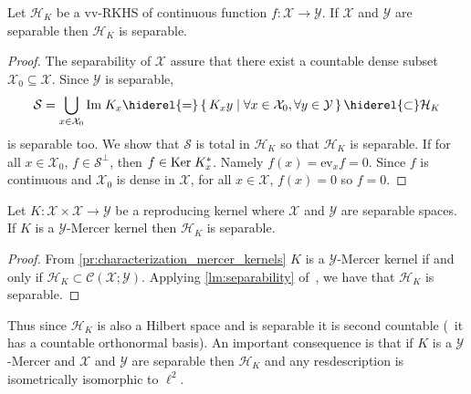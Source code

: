 \begin{lemma}
\label{lm:separability}
Let $\mathcal{H}_K$ be a \acl{vv-RKHS} of continuous function $f:\mathcal{X}\to\mathcal{Y}$. If $\mathcal{X}$ and $\mathcal{Y}$ are separable then $\mathcal{H}_K$ is separable.
\end{lemma}
\begin{proof}
The separability of $\mathcal{X}$ assure that there exist a countable dense subset $\mathcal{X}_0\subseteq\mathcal{X}$. Since $\mathcal{Y}$ is separable,
\begin{dmath*}
\mathcal{S}=\bigcup_{x\in\mathcal{X}_0}\Ima K_x \hiderel{=}\set{K_xy|\forall x\in\mathcal{X}_0, \forall y\in\mathcal{Y}}\hiderel{\subset} \mathcal{H}_K
\end{dmath*}
is separable too. We show that $\mathcal{S}$ is total in $\mathcal{H}_K$ so that $\mathcal{H}_K$ is separable. If for all $x\in\mathcal{X}_0$, $f\in\mathcal{S}^{\perp}$, then $f\in\text{Ker}\; K_x^*$. Namely $f(x)=\text{ev}_xf=0$. Since $f$ is continuous and $\mathcal{X}_0$ is dense in $\mathcal{X}$, for all $x\in\mathcal{X}$, $f(x)=0$ so $f=0$.
\end{proof}

\begin{proposition}
\label{pr:mercer_countable_basis}
Let $K:\mathcal{X}\times\mathcal{X}\to\mathcal{Y}$ be a reproducing kernel where $\mathcal{X}$ and $\mathcal{Y}$ are separable spaces. If $K$ is a $\mathcal{Y}$-Mercer kernel then $\mathcal{H}_K$ is separable.
\end{proposition}
\begin{proof}
From \cref{pr:characterization_mercer_kernels} $K$ is a $\mathcal{Y}$-Mercer kernel if and only if $\mathcal{H}_K\subset \mathcal{C}(\mathcal{X};\mathcal{Y})$. Applying \cref{lm:separability} of~\cite{carmeli2006vector}, we have that $\mathcal{H}_K$ is separable.
\end{proof}
Thus since $\mathcal{H}_K$ is also a Hilbert space and is separable it is second countable (\ie~it has a countable orthonormal basis). An important consequence is that if $K$ is a $\mathcal{Y}$-Mercer and $\mathcal{X}$ and $\mathcal{Y}$ are separable then $\mathcal{H}_K$ and any resdescription is isometrically isomorphic to $\ell^2$.

